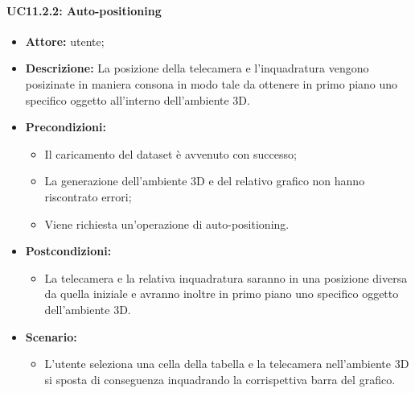 \paragraph{UC11.2.2: Auto-positioning}
\begin{itemize}    
    \item \textbf{Attore:} utente;
    \item \textbf{Descrizione:} La posizione della telecamera e l'inquadratura vengono posizinate in maniera consona in modo tale da ottenere in primo piano uno specifico oggetto all'interno dell'ambiente 3D.
    \item \textbf{Precondizioni:}    
        \begin{itemize}
            \item Il caricamento del dataset è avvenuto con successo;
            \item La generazione dell'ambiente 3D e del relativo grafico non hanno riscontrato errori;
            \item Viene richiesta un'operazione di auto-positioning.
        \end{itemize}    
    \item \textbf{Postcondizioni:}
        \begin{itemize}
            \item La telecamera e la relativa inquadratura saranno in una posizione diversa da quella iniziale e avranno inoltre in primo piano uno specifico oggetto dell'ambiente 3D.
        \end{itemize}    
    \item \textbf{Scenario:} 
        \begin{itemize}
            \item L'utente seleziona una cella della tabella e la telecamera nell'ambiente 3D si sposta di conseguenza inquadrando la corrispettiva barra del grafico.
        \end{itemize}
\end{itemize}

